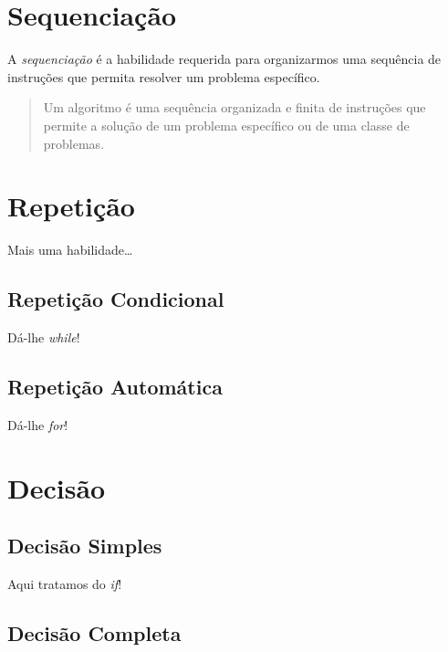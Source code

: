 \documentclass[
]{book}
\begin{document}
\hypertarget{seque}{%
\chapter{Sequenciação}\label{seque}}

A \emph{sequenciação} é a habilidade requerida para organizarmos uma sequência de instruções que permita resolver um problema específico.

\begin{quote}
Um algoritmo é uma sequência organizada e finita de instruções que permite a solução de um problema específico ou de uma classe de problemas.
\end{quote}

\hypertarget{repet}{%
\chapter{Repetição}\label{repet}}

Mais uma habilidade\ldots{}

\hypertarget{repet-while}{%
\section{Repetição Condicional}\label{repet-while}}

Dá-lhe \emph{while}!

\hypertarget{repet-for}{%
\section{Repetição Automática}\label{repet-for}}

Dá-lhe \emph{for}!

\hypertarget{decis}{%
\chapter{Decisão}\label{decis}}

\hypertarget{decis-if}{%
\section{Decisão Simples}\label{decis-if}}

Aqui tratamos do \emph{if}!

\hypertarget{decis-if-else}{%
\section{Decisão Completa}\label{decis-if-else}}
\end{document}
